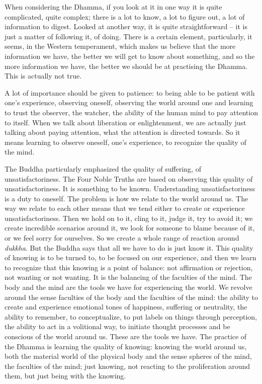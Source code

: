 
When considering the Dhamma, if you look at it in one way it is quite
complicated, quite complex; there is a lot to know, a lot to figure out, 
a lot of information to digest. Looked at another way, it is quite
straightforward -- it is just a matter of following it, of doing. There
is a certain element, particularly, it seems, in the Western
temperament, which makes us believe that the more information we have, 
the better we will get to know about something, and so the more
information we have, the better we should be at practising the Dhamma. 
This is actually not true. 

A lot of importance should be given to patience: to being able to be
patient with one's experience, observing oneself, observing the world
around one and learning to trust the observer, the watcher, the ability
of the human mind to pay attention to itself. When we talk about
liberation or enlightenment, we are actually just talking about paying
attention, what the attention is directed towards. So it means learning
to observe oneself, one's experience, to recognize the quality of the
mind. 

The Buddha particularly emphasized the quality of suffering, of
unsatisfactoriness. The Four Noble Truths are based on observing this
quality of unsatisfactoriness. It is something to be known. 
Understanding unsatisfactoriness is a duty to oneself. The problem is
how we relate to the world around us. The way we relate to each other
means that we tend either to create or experience unsatisfactoriness. 
Then we hold on to it, cling to it, judge it, try to avoid it; we create
incredible scenarios around it, we look for someone to blame because of
it, or we feel sorry for ourselves. So we create a whole range of
reaction around \emph{dukkha}. But the Buddha says that all we have to
do is just know it. This quality of knowing is to be turned to, to be
focused on our experience, and then we learn to recognize that this
knowing is a point of balance: not affirmation or rejection, not wanting
or not wanting. It is the balancing of the faculties of the mind. The
body and the mind are the tools we have for experiencing the world. We
revolve around the sense faculties of the body and the faculties of the
mind: the ability to create and experience emotional tones of happiness, 
suffering or neutrality, the ability to remember, to conceptualize, to
put labels on things through perception, the ability to act in a
volitional way, to initiate thought processes and be conscious of the
world around us. These are the tools we have. The practice of the Dhamma
is learning the quality of knowing: knowing the world around us, both
the material world of the physical body and the sense spheres of the
mind, the faculties of the mind; just knowing, not reacting to the
proliferation around them, but just being with the knowing. 

